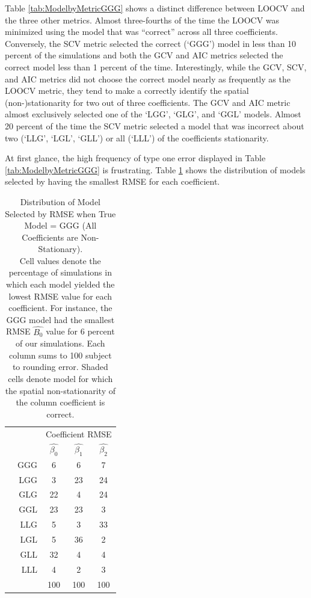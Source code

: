 \documentclass{article}\usepackage[]{graphicx}\usepackage[]{color}
\begin{document}
Table \ref{tab:ModelbyMetricGGG} shows a distinct difference between LOOCV and the three other metrics. Almost three-fourths of the time the LOOCV was minimized using the model that was ``correct'' across all three coefficients. Conversely, the SCV metric selected the correct (`GGG') model in less than 10 percent of the simulations and both the GCV and AIC metrics selected the correct model less than 1 percent of the time. Interestingly, while the GCV, SCV, and AIC metrics did not choose the correct model nearly as frequently as the LOOCV metric, they tend to make a correctly identify the spatial (non-)stationarity for two out of three coefficients. The GCV and AIC metric almost exclusively selected one of the `LGG', `GLG', and `GGL' models. Almost 20 percent of the time the SCV metric selected a model that was incorrect about two (`LLG', `LGL', `GLL') or all (`LLL') of the coefficients stationarity.

At first glance, the high frequency of type one error displayed in Table \ref{tab:ModelbyMetricGGG} is frustrating. Table \ref{tab:RMSEGGG} shows the distribution of models selected by having the smallest RMSE for each coefficient. 

\begin{table}[htb]
\centering
\begin{tabular}{crccc}
\multicolumn{2}{c}{} & \multicolumn{3}{c}{Coefficient RMSE}  \\ \cline{3-5}
\multicolumn{2}{c}{} & $\widehat{\beta_0}$ & $\widehat{\beta_1}$ & \multicolumn{1}{c}{$\widehat{\beta_2}$}  \\  
 \parbox[t]{2mm}{} & GGG & 6 & 6 & 7 \\ 
& LGG &  3 & 23 & 24 \\ 
&  GLG & 22 & 4 & 24  \\ 
&  GGL & 23 & 23 & 3  \\ 
&  LLG &  5 & 3 & 33 \\ 
&  LGL &  5 &  36 &  2  \\ 
&  GLL &  32 &  4 &  4 \\ 
&  LLL & 4 & 2 & 3 \\ 
&     & 100 & 100 & 100 \\   
\end{tabular}
\caption{Distribution of Model Selected by RMSE when True Model = GGG (All Coefficients are Non-Stationary).\\ Cell values denote the percentage of simulations in which each model yielded the lowest RMSE value for each coefficient. For instance, the GGG model had the smallest RMSE $\widehat{B_0}$ value for 6 percent of our simulations. Each column sums to 100 subject to rounding error. Shaded cells denote model for which the spatial non-stationarity of the column coefficient is correct. } \label{tab:RMSEGGG}
\end{table}
\end{document}
